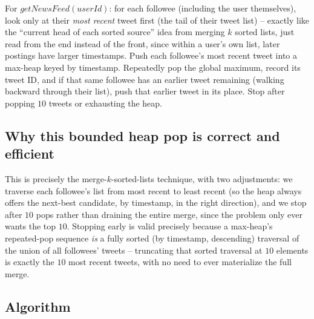 \begin{ideabox}
For $\textit{getNewsFeed}(\textit{userId})$: for each followee (including
the user themselves), look only at their \emph{most recent} tweet first
(the tail of their tweet list) -- exactly like the ``current head of each
sorted source'' idea from merging $k$ sorted lists, just read from the end
instead of the front, since within a user's own list, later postings have
larger timestamps. Push each followee's most recent tweet into a max-heap
keyed by timestamp. Repeatedly pop the global maximum, record its tweet
ID, and if that same followee has an earlier tweet remaining (walking
backward through their list), push that earlier tweet in its place. Stop
after popping $10$ tweets or exhausting the heap.
\end{ideabox}

\subsection*{Why this bounded heap pop is correct and efficient}

This is precisely the merge-$k$-sorted-lists technique, with two
adjustments: we traverse each followee's list from most recent to least
recent (so the heap always offers the next-best candidate, by timestamp,
in the right direction), and we stop after $10$ pops rather than draining
the entire merge, since the problem only ever wants the top $10$. Stopping
early is valid precisely because a max-heap's repeated-pop sequence
\emph{is} a fully sorted (by timestamp, descending) traversal of the
union of all followees' tweets -- truncating that sorted traversal at $10$
elements is exactly the $10$ most recent tweets, with no need to ever
materialize the full merge.

\subsection*{Algorithm}

